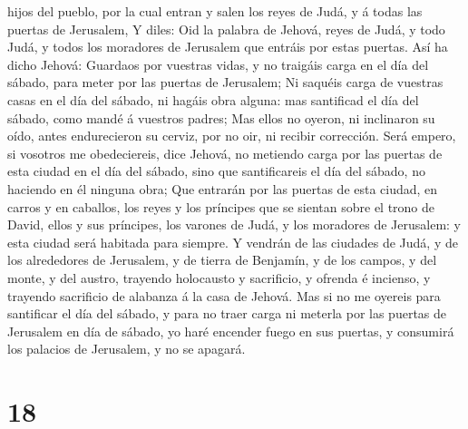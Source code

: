 hijos del pueblo, por la cual entran y salen los reyes de Judá, y á
todas las puertas de Jerusalem,  Y diles: Oid la palabra
de Jehová, reyes de Judá, y todo Judá, y todos los moradores de
Jerusalem que entráis por estas puertas.  Así ha dicho
Jehová: Guardaos por vuestras vidas, y no traigáis carga en el día del
sábado, para meter por las puertas de Jerusalem;  Ni
saquéis carga de vuestras casas en el día del sábado, ni hagáis obra
alguna: mas santificad el día del sábado, como mandé á vuestros padres;
 Mas ellos no oyeron, ni inclinaron su oído, antes
endurecieron su cerviz, por no oir, ni recibir corrección.
 Será empero, si vosotros me obedeciereis, dice Jehová,
no metiendo carga por las puertas de esta ciudad en el día del sábado,
sino que santificareis el día del sábado, no haciendo en él ninguna
obra;  Que entrarán por las puertas de esta ciudad, en
carros y en caballos, los reyes y los príncipes que se sientan sobre el
trono de David, ellos y sus príncipes, los varones de Judá, y los
moradores de Jerusalem: y esta ciudad será habitada para siempre.
 Y vendrán de las ciudades de Judá, y de los alrededores
de Jerusalem, y de tierra de Benjamín, y de los campos, y del monte, y
del austro, trayendo holocausto y sacrificio, y ofrenda é incienso, y
trayendo sacrificio de alabanza á la casa de Jehová.  Mas
si no me oyereis para santificar el día del sábado, y para no traer
carga ni meterla por las puertas de Jerusalem en día de sábado, yo haré
encender fuego en sus puertas, y consumirá los palacios de Jerusalem, y
no se apagará.

\hypertarget{section-17}{%
\section{18}\label{section-17}}

